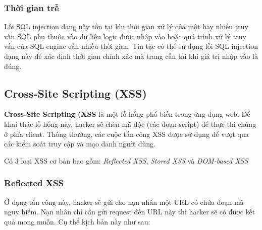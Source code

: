 \documentclass[../main-report.tex]{subfiles}
\begin{document}
\subsubsection*{Thời gian trễ}
Lỗi SQL injection dạng này tồn tại khi thời gian xử lý của một hay nhiều truy vấn SQL phụ thuộc vào dữ liệu logic được nhập vào hoặc quá trình xử lý truy vấn của SQL engine cần nhiều thời gian. Tin tặc có thể sử dụng lỗi SQL injection dạng này để xác định thời gian chính xác mà trang cần tải khi giá trị nhập vào là đúng.

\subsection{Cross-Site Scripting (XSS)}
\textbf{Cross-Site Scripting (XSS} là một lỗ hổng phổ biến trong ứng dụng web. Để khai thác lỗ hổng này, hacker sẽ chèn mã độc (các đoạn script) để thực thi chúng ở phía client. Thông thường, các cuộc tấn công XSS được sử dụng để vượt qua các kiểm soát truy cập và mạo danh người dùng.

Có 3 loại XSS cơ bản bao gồm: \emph{Reflected XSS}, \emph{Stored XSS} và \emph{DOM-based XSS}

\subsubsection*{Reflected XSS}
Ở dạng tấn công này, hacker sẽ gửi cho nạn nhân một URL có chứa đoạn mã nguy hiểm. Nạn nhân chỉ cần gửi request đến URL này thì hacker sẽ có được kết quả mong muốn. Cụ thể kịch bản này như sau:
\end{document}

